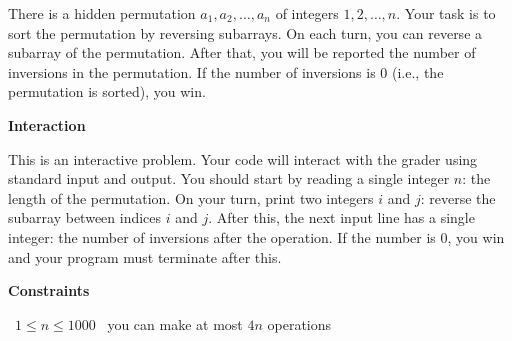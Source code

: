 There is a hidden permutation $a_1, a_2,\dots, a_n$ of integers $1, 2,\dots, n$. Your task is to sort the permutation by reversing subarrays.
On each turn, you can reverse a subarray of the permutation. After that, you will be reported the number of inversions in the permutation. If the number of inversions is $0$ (i.e., the permutation is sorted), you win.

\vspace{0.3cm}\noindent\textbf{Interaction}

This is an interactive problem. Your code will interact with the grader using standard input and output. You should start by reading a single integer $n$: the length of the permutation.
On your turn, print two integers $i$ and $j$: reverse the subarray between indices $i$ and $j$.
After this, the next input line has a single integer: the number of inversions after the operation. If the number is $0$, you win and your program must terminate after this.

\vspace{0.3cm}\noindent\textbf{Constraints}

\textbullet\ $1\leq n\leq 1000$
\textbullet\ you can make at most $4n$ operations